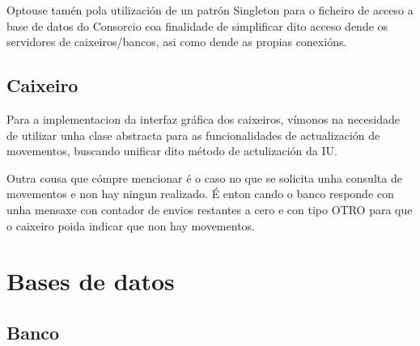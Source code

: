 \documentclass[a4paper,titlepage]{article}
\begin{document}
Optouse tamén pola utilización de un patrón Singleton para o ficheiro de acceso a base de datos do Consorcio coa finalidade de simplificar dito acceso dende os servidores de caixeiros/bancos, asi como dende as propias conexións.



\subsection {Caixeiro}
Para a implementacion da interfaz gráfica dos caixeiros, vímonos na necesidade de utilizar unha clase abstracta para as funcionalidades de actualización de movementos, buscando unificar dito método de actulización da IU.

Outra cousa que cómpre mencionar é o caso no que se solicita unha consulta de movementos e non hay ningun realizado. É enton cando o banco responde con unha mensaxe con contador de envios restantes a cero e con tipo OTRO para que o caixeiro poida indicar que non hay movementos.


\newpage

\clearpage
\newpage


\section {Bases de datos}
\subsection {Banco}
\end{document}

